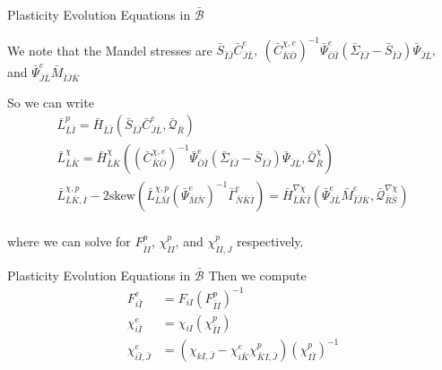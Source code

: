 \documentclass[11pt]{beamer}
\begin{document}
\begin{frame}{Plasticity Evolution Equations in $\bar{\mathcal{B}}$}

We note that the Mandel stresses are $\bar{S}_{\bar{I}\bar{J}} \bar{C}_{\bar{J}\bar{L}}^e,\  \left(\bar{C}_{\bar{K}\bar{O}}^{\chi,e}\right)^{-1} \bar{\Psi}_{\bar{O}\bar{I}}^e \left(\bar{\Sigma}_{\bar{I}\bar{J}} - \bar{S}_{\bar{I}\bar{J}}\right)\bar{\Psi}_{\bar{J}\bar{L}},$ and $\bar{\Psi}_{\bar{J}\bar{L}}^e\bar{M}_{\bar{I}\bar{J}\bar{K}}$

So we can write
\begin{align*}
\bar{L}_{\bar{L}\bar{I}}^p = \bar{H}_{\bar{L}\bar{I}} \left(\bar{S}_{\bar{I}\bar{J}} \bar{C}_{\bar{J}\bar{L}}^e,\bar{\mathcal{Q}}_{\bar{R}}\right)\\
\bar{L}_{\bar{L}\bar{K}}^{\chi} = \bar{H}_{\bar{L}\bar{K}}^{\chi}\left(\left(\bar{C}_{\bar{K}\bar{O}}^{\chi,e}\right)^{-1} \bar{\Psi}_{\bar{O}\bar{I}}^e \left(\bar{\Sigma}_{\bar{I}\bar{J}} - \bar{S}_{\bar{I}\bar{J}}\right)\bar{\Psi}_{\bar{J}\bar{L}},\bar{\mathcal{Q}}_{\bar{R}}^{\chi}\right)\\
\bar{L}_{\bar{L}\bar{K},\bar{I}}^{\chi,p}-2\text{skew}\left(\bar{L}_{\bar{L}\bar{M}}^{\chi,p}\left(\bar{\Psi}_{\bar{M}\bar{N}}^e\right)^{-1} \bar{\Gamma}_{\bar{N}\bar{K}\bar{I}}^e\right) = \bar{H}_{\bar{L}\bar{K}\bar{I}}^{\nabla\chi}\left(\bar{\Psi}_{\bar{J}\bar{L}}^e \bar{M}_{\bar{I}\bar{J}\bar{K}}^e,\bar{\mathcal{Q}}_{\bar{R}\bar{S}}^{\nabla \chi}\right)\\
\end{align*}

where we can solve for $F_{\bar{I}I}^p$, $\chi_{\bar{I}I}^p$, and $\chi_{\bar{I}I,J}^p$ respectively.

\end{frame}

\begin{frame}{Plasticity Evolution Equations in $\bar{\mathcal{B}}$}
Then we compute
\begin{align*}
F_{i\bar{I}}^e &= F_{iI} \left(F_{\bar{I}I}^p\right)^{-1}\\
\chi_{i\bar{I}}^e &= \chi_{iI} \left(\chi_{\bar{I}I}^p\right)\\ 
\chi_{i\bar{I},\bar{J}}^e &= \left(\chi_{kI,\bar{J}} - \chi_{i\bar{K}}^e \chi_{\bar{K}I,\bar{J}}^p\right)\left(\chi_{I\bar{I}}^p\right)^{-1}
\end{align*}
\end{frame}
\end{document}

